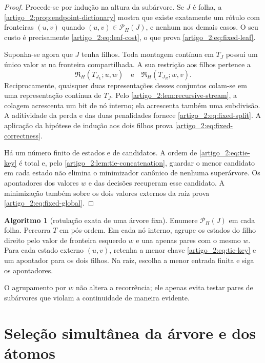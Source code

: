 \documentclass[12pt,a4paper]{article}
\theoremstyle{preciso}
\theoremstyle{definition}
\newcommand{\Representations}{\mathfrak{R}}
\newcommand{\Pairs}{\mathcal{P}}
\theoremstyle{preciso}
\theoremstyle{preciso}
\theoremstyle{preciso}
\theoremstyle{preciso}
\theoremstyle{definition}
\theoremstyle{preciso}
\newtheorem{algorithm}[teorema]{Algoritmo}
\theoremstyle{definition}
\theoremstyle{preciso}
\theoremstyle{preciso}
\theoremstyle{definition}
\begin{document}
\begin{proof}
Procede-se por indução na altura da subárvore. Se $J$ é folha, a
\cref{artigo_2:prop:endpoint-dictionary} mostra que existe exatamente um rótulo com
fronteiras $(u,v)$ quando $(u,v)\in\Pairs_H(J)$, e nenhum nos demais casos.
O seu custo é precisamente \eqref{artigo_2:eq:leaf-cost}, o que prova
\eqref{artigo_2:eq:fixed-leaf}.

Suponha-se agora que $J$ tenha filhos. Toda montagem contínua em $T_J$ possui um
único valor $w$ na fronteira compartilhada. A sua restrição aos filhos pertence
a
\[
 \Representations_H(T_{J_L};u,w)
 \quad\text{e}\quad
 \Representations_H(T_{J_R};w,v).
\]
Reciprocamente, quaisquer duas representações desses conjuntos colam-se em
uma representação contínua de $T_J$. Pelo \cref{artigo_2:lem:recursive-stream}, a
colagem acrescenta um bit de nó interno; ela acrescenta também uma
subdivisão. A aditividade da perda e das duas penalidades fornece
\eqref{artigo_2:eq:fixed-split}. A aplicação da hipótese de indução aos dois filhos prova
\eqref{artigo_2:eq:fixed-correctness}.

Há um número finito de estados e de candidatos. A ordem de
\eqref{artigo_2:eq:tie-key} é total e, pelo \cref{artigo_2:lem:tie-concatenation}, guardar o
menor candidato em cada estado não elimina o minimizador canônico de nenhuma
superárvore. Os apontadores dos valores $w$ e das decisões recuperam esse
candidato. A minimização também sobre os dois valores externos da raiz prova
\eqref{artigo_2:eq:fixed-global}.
\end{proof}

\begin{algorithm}[rotulação exata de uma árvore fixa]\label{map:artigo_2:6.3}
\label{artigo_2:alg:fixed-tree}
Enumere $\Pairs_H(J)$ em cada folha. Percorra $T$ em pós-ordem. Em cada nó
interno, agrupe os estados do filho direito pelo valor de fronteira esquerdo
$w$ e una apenas pares com o mesmo $w$. Para cada estado externo $(u,v)$,
retenha a menor chave \eqref{artigo_2:eq:tie-key} e um apontador para os dois filhos.
Na raiz, escolha a menor entrada finita e siga os apontadores.
\end{algorithm}

O agrupamento por $w$ não altera a recorrência; ele apenas evita testar pares
de subárvores que violam a continuidade de maneira evidente.

\section{Seleção simultânea da árvore e dos átomos}
\label{artigo_2:sec:variable-dp}
\end{document}
